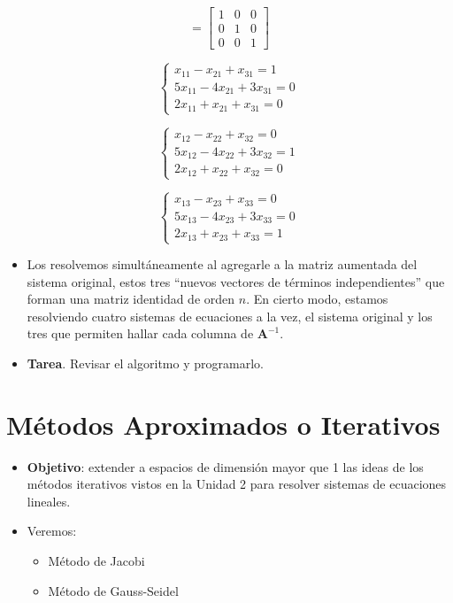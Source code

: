 \documentclass[openany]{book}
\providecommand{\tightlist}{%
  \setlength{\itemsep}{0pt}\setlength{\parskip}{0pt}}
\begin{document}
\[
=
\begin{bmatrix}
1 & 0 & 0 \\
0 & 1 & 0 \\
0 & 0 & 1 
\end{bmatrix}
\]

\[
\begin{cases} 
x_{11}-x_{21}+x_{31}=1 \\
5x_{11}-4x_{21}+3x_{31}=0 \\
2x_{11}+x_{21}+x_{31}=0
\end{cases}
\]

\[
\begin{cases} 
x_{12}-x_{22}+x_{32}=0 \\
5x_{12}-4x_{22}+3x_{32}=1 \\
2x_{12}+x_{22}+x_{32}=0
\end{cases}
\]

\[
\begin{cases} 
x_{13}-x_{23}+x_{33}=0 \\
5x_{13}-4x_{23}+3x_{33}=0 \\
2x_{13}+x_{23}+x_{33}=1
\end{cases}
\]

\begin{itemize}
\tightlist
\item
  Los resolvemos simultáneamente al agregarle a la matriz aumentada del sistema original, estos tres ``nuevos vectores de términos independientes'' que forman una matriz identidad de orden \(n\). En cierto modo, estamos resolviendo cuatro sistemas de ecuaciones a la vez, el sistema original y los tres que permiten hallar cada columna de \(\mathbf{A}^{-1}\).
\item
  \textbf{Tarea}. Revisar el algoritmo y programarlo.
\end{itemize}

\hypertarget{muxe9todos-aproximados-o-iterativos}{%
\section{Métodos Aproximados o Iterativos}\label{muxe9todos-aproximados-o-iterativos}}

\begin{itemize}
\item
  \textbf{Objetivo}: extender a espacios de dimensión mayor que 1 las ideas de los métodos iterativos vistos en la Unidad 2 para resolver sistemas de ecuaciones lineales.
\item
  Veremos:

  \begin{itemize}
  \tightlist
  \item
    Método de Jacobi
  \item
    Método de Gauss-Seidel
  \end{itemize}
\end{itemize}
\end{document}
